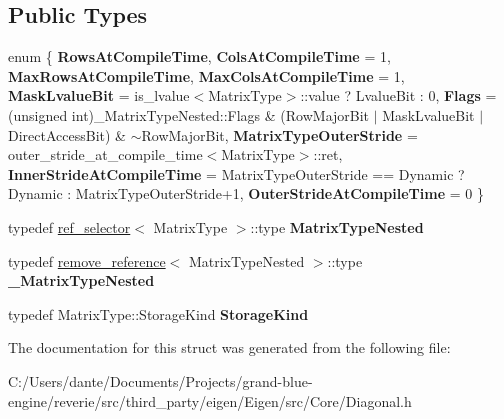 \subsection*{Public Types}
\begin{DoxyCompactItemize}
\item 
\mbox{\label{struct_eigen_1_1internal_1_1traits_3_01_diagonal_3_01_matrix_type_00_01_diag_index_01_4_01_4_a6e51b54420daeaf6f6d5ea2753b1fe48}} 
enum \{ \newline
{\bfseries Rows\+At\+Compile\+Time}, 
{\bfseries Cols\+At\+Compile\+Time} = 1, 
{\bfseries Max\+Rows\+At\+Compile\+Time}, 
{\bfseries Max\+Cols\+At\+Compile\+Time} = 1, 
\newline
{\bfseries Mask\+Lvalue\+Bit} = is\+\_\+lvalue$<$Matrix\+Type$>$\+::value ? Lvalue\+Bit \+: 0, 
{\bfseries Flags} = (unsigned int)\+\_\+\+Matrix\+Type\+Nested\+::Flags \& (Row\+Major\+Bit $\vert$ Mask\+Lvalue\+Bit $\vert$ Direct\+Access\+Bit) \& $\sim$\+Row\+Major\+Bit, 
{\bfseries Matrix\+Type\+Outer\+Stride} = outer\+\_\+stride\+\_\+at\+\_\+compile\+\_\+time$<$Matrix\+Type$>$\+::ret, 
{\bfseries Inner\+Stride\+At\+Compile\+Time} = Matrix\+Type\+Outer\+Stride == Dynamic ? Dynamic \+: Matrix\+Type\+Outer\+Stride+1, 
\newline
{\bfseries Outer\+Stride\+At\+Compile\+Time} = 0
 \}
\item 
\mbox{\label{struct_eigen_1_1internal_1_1traits_3_01_diagonal_3_01_matrix_type_00_01_diag_index_01_4_01_4_aadca7c151a56c6b83fbcc717d5b77667}} 
typedef \mbox{\hyperlink{struct_eigen_1_1internal_1_1ref__selector}{ref\+\_\+selector}}$<$ Matrix\+Type $>$\+::type {\bfseries Matrix\+Type\+Nested}
\item 
\mbox{\label{struct_eigen_1_1internal_1_1traits_3_01_diagonal_3_01_matrix_type_00_01_diag_index_01_4_01_4_a1e1e771fa8ef2e2332d224e813e64a84}} 
typedef \mbox{\hyperlink{struct_eigen_1_1internal_1_1remove__reference}{remove\+\_\+reference}}$<$ Matrix\+Type\+Nested $>$\+::type {\bfseries \+\_\+\+Matrix\+Type\+Nested}
\item 
\mbox{\label{struct_eigen_1_1internal_1_1traits_3_01_diagonal_3_01_matrix_type_00_01_diag_index_01_4_01_4_a7255733bcda46fcc7cc0bcaafaf92506}} 
typedef Matrix\+Type\+::\+Storage\+Kind {\bfseries Storage\+Kind}
\end{DoxyCompactItemize}


The documentation for this struct was generated from the following file\+:\begin{DoxyCompactItemize}
\item 
C\+:/\+Users/dante/\+Documents/\+Projects/grand-\/blue-\/engine/reverie/src/third\+\_\+party/eigen/\+Eigen/src/\+Core/Diagonal.\+h\end{DoxyCompactItemize}
